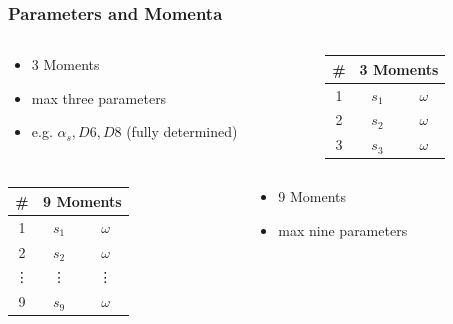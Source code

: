 \documentclass[fleqn]{beamer}
\begin{document}
\begin{frame}
  \frametitle{Parameters and Momenta}
  \begin{columns}
    \begin{column}{.6\textwidth}
      \begin{itemize}
        \item 3 Moments
        \item max three parameters
        \item e.g. \(\alpha_s, D6, D8\) (fully determined)
      \end{itemize}
    \end{column}
    \begin{column}{.4\textwidth}
      \begin{tabular}{ccc}
        \toprule
        \# &\multicolumn{2}{c}{3 Moments} \\
        \midrule
        1 & \(s_1\) & \(\omega\) \\
        2 & \(s_2\) & \(\omega\) \\
        3 & \(s_3\) & \(\omega\) \\
        \bottomrule
      \end{tabular}
    \end{column}
  \end{columns}
  \vfill
  \begin{columns}
    \begin{column}{.4\textwidth}
      \centering
      \begin{tabular}{ccc}
        \toprule
        \# &\multicolumn{2}{c}{9 Moments} \\
        \midrule
        1      & \(s_1\) & \(\omega\) \\
        2      & \(s_2\) & \(\omega\) \\
        \vdots & \vdots  & \vdots     \\
        9      & \(s_9\) & \(\omega\) \\
        \bottomrule
      \end{tabular}
    \end{column}
    \begin{column}{.6\textwidth}
      \begin{itemize}
      \item 9 Moments
      \item max nine parameters
      \end{itemize}
    \end{column}
  \end{columns}
\end{frame}
\end{document}
